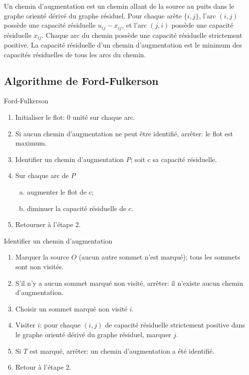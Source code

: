 Un chemin d'augmentation est un chemin allant de la source au puits dans le graphe
orienté dérivé du graphe résiduel.
Pour chaque arête $\lbrace i,j \rbrace$, l'arc $(i,j)$ possède une capacité résiduelle $u_{ij} - x_{ij}$, et l'arc $(j,i)$ possède une capacité résiduelle $x_{ij}$.
Chaque arc du chemin possède une capacité résiduelle strictement positive.
La capacité résiduelle d'un chemin d'augmentation est le minimum des capacités résiduelles de tous les arcs du chemin.

\subsection{Algorithme de Ford-Fulkerson}

\begin{algo}{Ford-Fulkerson}
\begin{enumerate}
 \item 
 Initialiser le flot: 0 unité sur chaque arc.
 \item
 Si aucun chemin d'augmentation ne peut être identifié, arrêter: le flot est maximum.
 \item
 Identifier un chemin d'augmentation $P$; soit $c$ sa capacité résiduelle.
 \item
 Sur chaque arc de $P$
 \begin{enumerate}[(a)]
  \item
   augmenter le flot de $c$;
  \item
   diminuer la capacité résiduelle de $c$.
 \end{enumerate}
 \item
 Retourner à l'étape 2.
 \end{enumerate}
\end{algo}

\begin{algo}
Identifier un chemin d'augmentation
\begin{enumerate}
 \item
  Marquer la source $O$ (aucun autre sommet n'est marqué); tous les sommets sont non visités.
 \item
  S'il n'y a aucun sommet marqué non visité, arrêter: il n'existe aucun chemin d'augmentation.
 \item
  Choisir un sommet marqué non visité $i$.
 \item
  Visiter $i$: pour chaque $(i,j)$ de capacité résiduelle strictement positive dans le graphe orienté dérivé du graphe résiduel, marquer $j$.
 \item
  Si $T$ est marqué, arrêter: un chemin d'augmentation a été identifié.
 \item
  Retour à l'étape 2.
\end{enumerate}
\end{algo}

